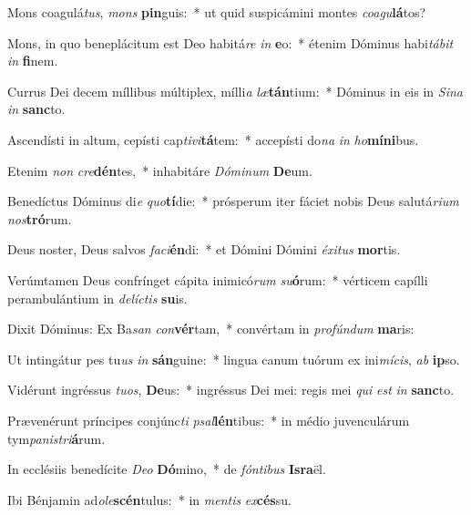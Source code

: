 \item Mons coagulá\textit{tus}, \textit{mons} \textbf{pin}guis:~* ut quid suspicámini montes \textit{co}\textit{a}\textit{gu}\textbf{lá}tos?
\item Mons, in quo beneplácitum est Deo habitá\textit{re} \textit{in} \textbf{e}o:~* étenim Dóminus habi\textit{tá}\textit{bit} \textit{in} \textbf{fi}nem.
\item Currus Dei decem míllibus múltiplex, mílli\textit{a} \textit{læ}\textbf{tán}tium:~* Dóminus in eis in \textit{Si}\textit{na} \textit{in} \textbf{sanc}to.
\item Ascendísti in altum, cepísti cap\textit{ti}\textit{vi}\textbf{tá}tem:~* accepísti do\textit{na} \textit{in} \textit{ho}\textbf{mí}\textbf{ni}bus.
\item Etenim \textit{non} \textit{cre}\textbf{dén}tes,~* inhabitáre \textit{Dó}\textit{mi}\textit{num} \textbf{De}um.
\item Benedíctus Dóminus di\textit{e} \textit{quo}\textbf{tí}die:~* prósperum iter fáciet nobis Deus salutá\textit{ri}\textit{um} \textit{nos}\textbf{tró}rum.
\item Deus noster, Deus salvos \textit{fa}\textit{ci}\textbf{én}di:~* et Dómini Dómini \textit{éx}\textit{i}\textit{tus} \textbf{mor}tis.
\item Verúmtamen Deus confrínget cápita inimicó\textit{rum} \textit{su}\textbf{ó}rum:~* vérticem capílli perambulántium in \textit{de}\textit{líc}\textit{tis} \textbf{su}is.
\item Dixit Dóminus: Ex Ba\textit{san} \textit{con}\textbf{vér}tam,~* convértam in \textit{pro}\textit{fún}\textit{dum} \textbf{ma}ris:
\item Ut intingátur pes tu\textit{us} \textit{in} \textbf{sán}guine:~* lingua canum tuórum ex ini\textit{mí}\textit{cis}, \textit{ab} \textbf{ip}so.
\item Vidérunt ingréssus \textit{tu}\textit{os}, \textbf{De}us:~* ingréssus Dei mei: regis mei \textit{qui} \textit{est} \textit{in} \textbf{sanc}to.
\item Prævenérunt príncipes conjúnc\textit{ti} \textit{psal}\textbf{lén}tibus:~* in médio juvenculárum tym\textit{pa}\textit{nis}\textit{tri}\textbf{á}rum.
\item In ecclésiis benedícite \textit{De}\textit{o} \textbf{Dó}mino,~* de \textit{fón}\textit{ti}\textit{bus} \textbf{Is}\textbf{ra}ël.
\item Ibi Bénjamin ad\textit{o}\textit{le}\textbf{scén}tulus:~* in \textit{men}\textit{tis} \textit{ex}\textbf{cés}su.
